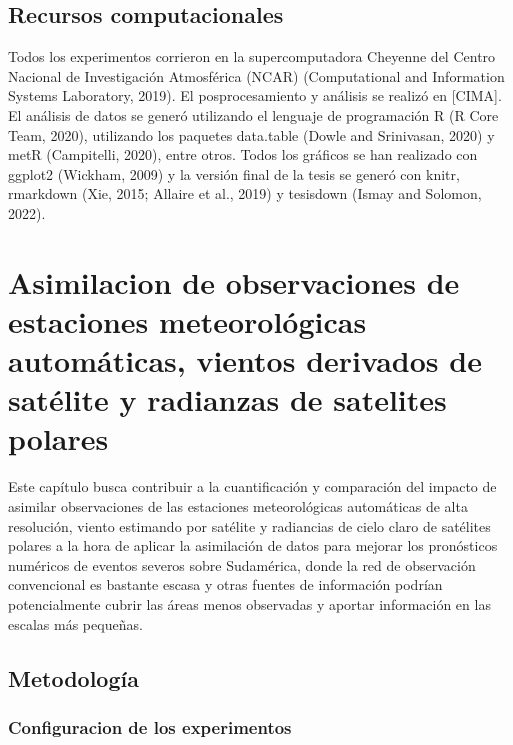 \documentclass[12pt,oneside,a4paper]{reedthesis}
\begin{document}
\hypertarget{recursos-computacionales}{%
\section{Recursos computacionales}\label{recursos-computacionales}}

Todos los experimentos corrieron en la supercomputadora Cheyenne del Centro Nacional de Investigación Atmosférica (NCAR) (Computational and Information Systems Laboratory, 2019). El posprocesamiento y análisis se realizó en {[}CIMA{]}. El análisis de datos se generó utilizando el lenguaje de programación R (R Core Team, 2020), utilizando los paquetes data.table (Dowle and Srinivasan, 2020) y metR (Campitelli, 2020), entre otros.
Todos los gráficos se han realizado con ggplot2 (Wickham, 2009) y la versión final de la tesis se generó con knitr, rmarkdown (Xie, 2015; Allaire et al., 2019) y tesisdown (Ismay and Solomon, 2022).

\hypertarget{ch1}{%
\chapter{Asimilacion de observaciones de estaciones meteorológicas automáticas, vientos derivados de satélite y radianzas de satelites polares}\label{ch1}}

Este capítulo busca contribuir a la cuantificación y comparación del impacto de asimilar observaciones de las estaciones meteorológicas automáticas de alta resolución, viento estimando por satélite y radiancias de cielo claro de satélites polares a la hora de aplicar la asimilación de datos para mejorar los pronósticos numéricos de eventos severos sobre Sudamérica, donde la red de observación convencional es bastante escasa y otras fuentes de información podrían potencialmente cubrir las áreas menos observadas y aportar información en las escalas más pequeñas.

\hypertarget{metodologuxeda}{%
\section{Metodología}\label{metodologuxeda}}

\hypertarget{config}{%
\subsection{Configuracion de los experimentos}\label{config}}
\end{document}

